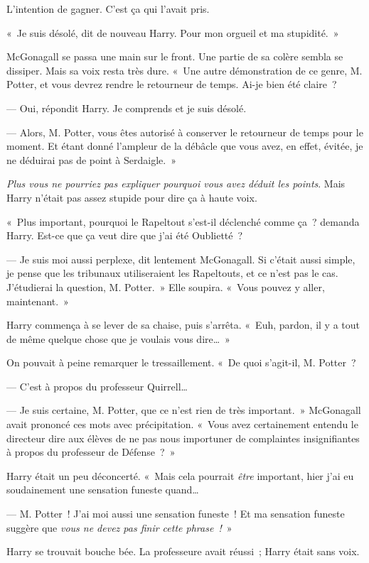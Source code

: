 L'intention de gagner. C'est ça qui l'avait pris.

«~Je suis désolé, dit de nouveau Harry.
Pour mon orgueil et ma stupidité.~»

McGonagall se passa une main sur le front.
Une partie de sa colère sembla se dissiper.
Mais sa voix resta très dure.
«~Une autre démonstration de ce genre, M. Potter, et vous devrez rendre le retourneur de temps.
Ai-je bien été claire~?

--- Oui, répondit Harry. Je comprends et je suis désolé.

--- Alors, M. Potter, vous êtes autorisé à conserver le retourneur de temps pour le moment.
Et étant donné l'ampleur de la débâcle que vous avez, en effet, évitée, je ne déduirai pas de point à Serdaigle.~»

\emph{Plus vous ne pourriez pas expliquer pourquoi vous avez déduit les points}.
Mais Harry n'était pas assez stupide pour dire ça à haute voix.

«~Plus important, pourquoi le Rapeltout s'est-il déclenché comme ça~? demanda Harry.
Est-ce que ça veut dire que j'ai été Oublietté~?

--- Je suis moi aussi perplexe, dit lentement McGonagall.
Si c'était aussi simple, je pense que les tribunaux utiliseraient les Rapeltouts, et ce n'est pas le cas.
J'étudierai la question, M. Potter.~» Elle soupira.
«~Vous pouvez y aller, maintenant.~»

Harry commença à se lever de sa chaise, puis s'arrêta.
«~Euh, pardon, il y a tout de même quelque chose que je voulais vous dire…~»

On pouvait à peine remarquer le tressaillement.
«~De quoi s'agit-il, M. Potter~?

--- C'est à propos du professeur Quirrell…

--- Je suis certaine, M. Potter, que ce n'est rien de très important.~»
McGonagall avait prononcé ces mots avec précipitation.
«~Vous avez certainement entendu le directeur dire aux élèves de ne pas nous importuner de complaintes insignifiantes à propos du professeur de Défense~?~»

Harry était un peu déconcerté.
«~Mais cela pourrait \emph{être} important, hier j'ai eu soudainement une sensation funeste quand…

--- M. Potter~! J'ai moi aussi une sensation funeste~!
Et ma sensation funeste suggère que \emph{vous ne devez pas finir cette phrase~!}~»

Harry se trouvait bouche bée.
La professeure avait réussi~; Harry était sans voix.

